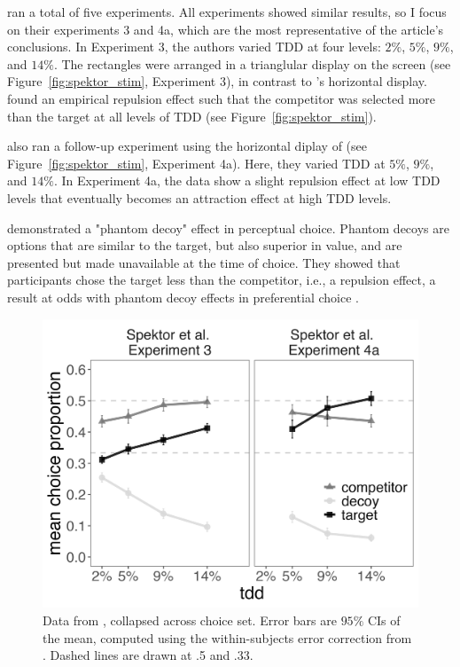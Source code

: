 \textcite{spektorWhenGoodLooks2018b} ran a total of five experiments. All experiments showed similar results, so I focus on their experiments 3 and 4a, which are the most representative of the article's conclusions. In Experiment 3, the authors varied TDD at four levels: $2\%$, $5\%$, $9\%$, and $14\%$. The rectangles were arranged in a trianglular display on the screen (see Figure~\ref{fig:spektor_stim}, Experiment 3), in contrast to \textcite{trueblood2013not}'s horizontal display. \textcite{spektorWhenGoodLooks2018b} found an empirical repulsion effect such that the competitor was selected more than the target at all levels of TDD (see Figure~\ref{fig:spektor_stim}). 

\textcite{spektorWhenGoodLooks2018b} also ran a follow-up experiment using the horizontal diplay of \textcite{trueblood2013not} (see Figure~\ref{fig:spektor_stim}, Experiment 4a). Here, they varied TDD at $5\%$, $9\%$, and $14\%$. In Experiment 4a, the data show a slight repulsion effect at low TDD levels that eventually becomes an attraction effect at high TDD levels. 

\textcite{truebloodPhantomDecoyEffect2017c} demonstrated a "phantom decoy" effect in perceptual choice. Phantom decoys are options that are similar to the target, but also superior in value, and are presented but made unavailable at the time of choice. They showed that participants chose the target less than the competitor, i.e., a repulsion effect, a result at odds with phantom decoy effects in preferential choice \parencite{pratkanisBriefHistoryResearch1992b,pettiboneExaminingModelsNondominated2000}. 

\begin{figure}
   \includegraphics[width=\linewidth]{figures/spektor_data_collapsed.jpeg}
   \caption{Data from \textcite{spektorWhenGoodLooks2018b}, collapsed across choice set. Error bars are $95\%$ CIs of the mean, computed using the within-subjects error correction from \textcite{morey2008confidence}. Dashed lines are drawn at .5 and .33.}
   \label{fig:spektor_data} %
\end{figure}

